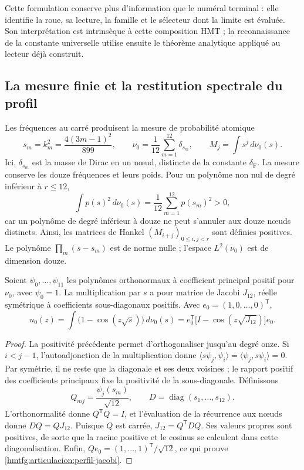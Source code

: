 Cette formulation conserve plus d’information que le numéral terminal :
elle identifie la roue, sa lecture, la famille et le sélecteur dont la limite
est évaluée. Son interprétation est intrinsèque à cette composition HMT ;
la reconnaissance de la constante universelle utilise ensuite le théorème
analytique appliqué au lecteur déjà construit.

\subsection{La mesure finie et la restitution spectrale du profil}
\label{hmtfg:articulacion:jacobi}

Les fréquences au carré produisent la mesure de probabilité atomique
\begin{equation}
 s_m=k_m^2=\frac{4(3m-1)^2}{899},\qquad
 \nu_0=\frac1{12}\sum_{m=1}^{12}\delta_{s_m},\qquad
 M_j=\int s^j\,d\nu_0(s).
 \label{hmtfg:articulacion:medida-finita}
\end{equation}
Ici, \(\delta_{s_m}\) est la masse de Dirac en un nœud, distincte
de la constante \(\delta_{\mathrm F}\). La mesure conserve les
douze fréquences et leurs poids. Pour un polynôme non nul de degré inférieur
à \(r\le12\),
\[
 \int p(s)^2\,d\nu_0(s)
 =\frac1{12}\sum_{m=1}^{12}p(s_m)^2>0,
\]
car un polynôme de degré inférieur à douze ne peut s’annuler aux
douze nœuds distincts. Ainsi, les matrices de Hankel
\((M_{i+j})_{0\le i,j<r}\) sont définies positives.
Le polynôme \(\prod_m(s-s_m)\) est de norme nulle ; l’espace
\(L^2(\nu_0)\) est de dimension douze.

\begin{proposition}
\label{hmtfg:articulacion:representacion}
Soient \(\psi_0,\ldots,\psi_{11}\) les polynômes orthonormaux
à coefficient principal positif pour \(\nu_0\), avec
\(\psi_0=1\). La multiplication par \(s\) a pour matrice de
Jacobi \(J_{12}\), réelle symétrique à coefficients sous-diagonaux positifs.
Avec \(e_0=(1,0,\ldots,0)^{\mathsf T}\),
\begin{equation}
 u_0(z)=\int\bigl(1-\cos(z\sqrt{s})\bigr)\,d\nu_0(s)
 =e_0^{\mathsf T}\bigl[I-\cos(z\sqrt{J_{12}})\bigr]e_0.
 \label{hmtfg:articulacion:perfil-jacobi}
\end{equation}
\end{proposition}
\begin{proof}
La positivité précédente permet d’orthogonaliser jusqu’au degré onze.
Si \(i<j-1\), l’autoadjonction de la multiplication donne
\(\langle s\psi_j,\psi_i\rangle
=\langle\psi_j,s\psi_i\rangle=0\).
Par symétrie, il ne reste que la diagonale et ses deux voisines ; le rapport
positif des coefficients principaux fixe la positivité de la
sous-diagonale. Définissons
\[
 Q_{mj}=\frac{\psi_j(s_m)}{\sqrt{12}},\qquad
 D=\operatorname{diag}(s_1,\ldots,s_{12}).
\]
L’orthonormalité donne \(Q^{\mathsf T}Q=I\), et l’évaluation de la
récurrence aux nœuds donne \(DQ=QJ_{12}\). Puisque \(Q\) est
carrée, \(J_{12}=Q^{\mathsf T}DQ\). Ses valeurs propres sont
positives, de sorte que la racine positive et le cosinus se calculent dans
cette diagonalisation. Enfin,
\(Qe_0=(1,\ldots,1)^{\mathsf T}/\sqrt{12}\), ce qui prouve
\eqref{hmtfg:articulacion:perfil-jacobi}.
\end{proof}

